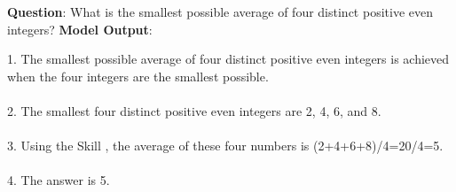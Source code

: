 \documentclass{article} %
\begin{document}
\begin{tcolorbox}[title = {MATH}, colback = Apricot!25!white, colframe = BrickRed!75!black] 
\textbf{Question}: What is the smallest possible average of four distinct positive even integers?
\tcblower
\textbf{Model Output}:


\quad


1. The smallest possible average of four distinct positive even integers is achieved when the four integers  are the smallest possible. \\ \\
2. The smallest four distinct positive even integers are 2, 4, 6, and 8. \\ \\
3. Using the Skill , the average of these four numbers is (2+4+6+8)/4=20/4=5. \\ \\
4. The answer is 5. 
\end{tcolorbox}
\noindent\begin{minipage}{\textwidth}
 \label{Tab:example_compose_math_skill_1}
\end{minipage}




\newpage
\end{document}
